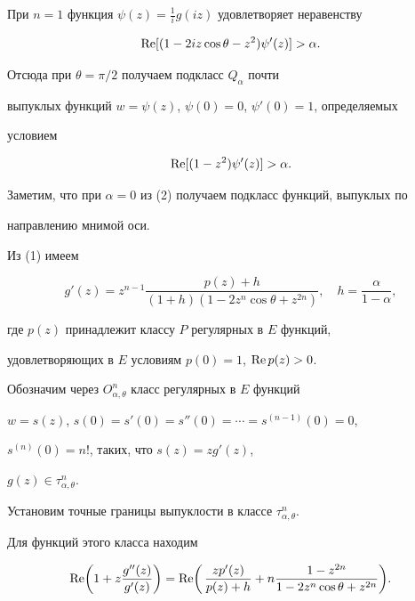 При $n=1$ функция $\psi(z)=\frac{1}{i}g(iz)$ удовлетворяет неравенству


$$


\re[(1-2iz\cos\theta-z^2)\psi'(z)]>\alpha.


$$





Отсюда при $\theta=\pi/2$ получаем подкласс $Q_\alpha$ \cite{Rob} почти


выпуклых функций $w=\psi(z)$, $\psi(0)=0$, $\psi'(0)=1$, определяемых


условием


\begin{equation}


\re[(1-z^2)\psi'(z)]>\alpha.


\end{equation}


Заметим, что при $\alpha=0$ из (2) получаем подкласс функций, выпуклых по


направлению мнимой оси.





Из (1) имеем


$$


g'(z)=z^{n-1}\frac{p(z)+h}{(1+h)(1-2z^n\cos\theta+z^{2n})},\quad


h=\frac{\alpha}{1-\alpha},


$$


где $p(z)$ принадлежит классу $P$ регулярных в $E$ функций,


удовлетворяющих в $E$ условиям $p(0)=1$, $\operatorname{Re} p(z)>0$.





Обозначим через $O^n_{\alpha,\theta}$ класс регулярных в $E$ функций


$w=s(z)$, $s(0)=s'(0)=s''(0)=\dotsb=s^{(n-1)}(0)=0$,


$s^{(n)}(0)=n!$, таких, что $s(z)=zg'(z)$,


$g(z)\in\tau^n_{\alpha,\theta}$.





Установим точные границы выпуклости в классе $\tau^n_{\alpha,\theta}$.


Для функций этого класса находим


\begin{equation}


\re\biggl(1+z\frac{g''(z)}{g'(z)}\biggr) =


\re\biggl(\,\frac{zp'(z)}{p(z)+h}+n


\frac{1-z^{2n}}{1-2z^n\cos\theta+z^{2n}}\biggr).


\end{equation}


